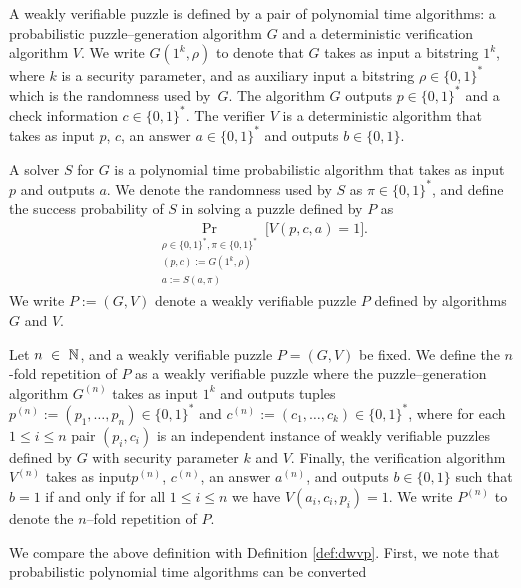 \begin{definition}
  \label{def:wvp}
A \textnormal{weakly verifiable puzzle} is defined by a pair of polynomial time algorithms:
a probabilistic puzzle--generation algorithm $G$ and a deterministic verification algorithm $V$.
We write $G(1^k, \rho)$ to denote that $G$ takes as input a bitstring $1^k$, where $k$ is a security parameter,
and as auxiliary input a bitstring $\rho \in \{0,1\}^{*}$ which is the randomness used by~$G$.
The algorithm $G$ outputs $p \in \{0,1\}^{*}$ and a check information $c \in \{0,1\}^{*}$.
The \textnormal{verifier} $V$ is a deterministic algorithm that takes as input $p$, $c$, an answer $a \in \{0,1\}^{*}$
and outputs $b \in \{0,1\}$.

A \textnormal{solver} $S$ for $G$ is a polynomial time probabilistic algorithm that
takes as input $p$ and outputs $a$. We denote the randomness used by $S$ as $\pi \in \{0,1\}^{*}$,
and define the \textnormal{success probability} of $S$ in solving a puzzle defined by $P$ as
\begin{align*}
  \underset{\substack{\rho \in \{0,1\}^{*}, \pi \in \{0,1\}^{*} \\ (p,c):=G(1^k, \rho) \\ a := S(a,\pi)}}{\Pr}\Big[ V(p,c,a) = 1\Big].
\end{align*}
We write $P := (G,V)$ denote a weakly verifiable puzzle $P$ defined by algorithms $G$ and $V$.
\end{definition}
%
\begin{definition}
  \label{def:n-fold-rep}
  Let $n~\in~\mathbb{N}$, and a weakly verifiable puzzle $P = (G,V)$ be fixed.
  We define the $n$-fold repetition of $P$ as a weakly verifiable puzzle where the puzzle--generation algorithm
  $G^{(n)}$ takes as input $1^k$ and outputs tuples $p^{(n)} := (p_1, \dotsc, p_n) \in \{0,1\}^{*}$ and $c^{(n)} := (c_1, \dotsc, c_k) \in \{0,1\}^{*}$,
  where for each $1 \leq i \leq n$ pair $(p_i, c_i)$ is an independent instance of weakly verifiable puzzles defined by $G$ with security parameter $k$ and $V$.
  Finally, the verification algorithm $V^{(n)}$ takes as input$p^{(n)}$, $c^{(n)}$, an answer $a^{(n)}$, and outputs $b \in \{0,1\}$
  such that $b = 1$ if and only if for all $1 \leq i \leq n$ we have $V(a_i, c_i, p_i) = 1$.
  We write $P^{(n)}$ to denote the $n$--fold repetition of $P$.
 \end{definition}
%
We compare the above definition with Definition \ref{def:dwvp}. First, we note that probabilistic polynomial time algorithms can be converted
